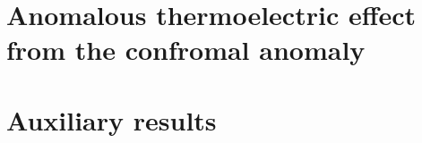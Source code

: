 \documentclass[
fontsize=11pt,
paper=B5,
BCOR=5mm,
captions=tableheading,
]{scrbook}
\begin{document}
\chapter{Anomalous thermoelectric effect from the confromal anomaly}\label{ch:charge-current}






\appendix


\chapter{Auxiliary results}\label{sec:aux-appendix}




\backmatter
\nocite{arjonaromanoNovelThermoelectricElastic2019}
\printbibliography[heading=bibintoc]

% 
\end{document}
